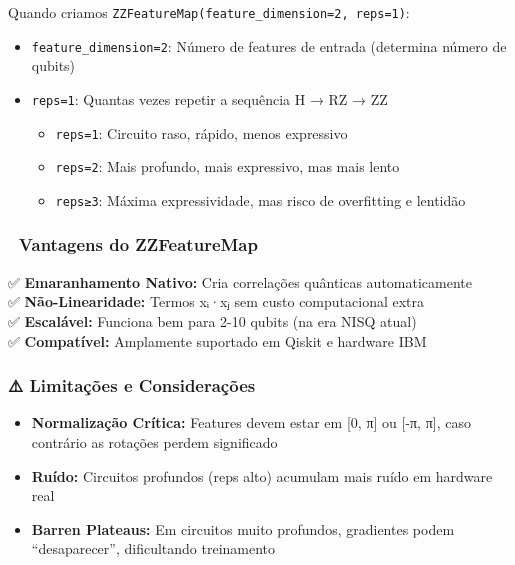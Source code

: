 \documentclass[
  brazilian,
]{report}
\providecommand{\tightlist}{%
  \setlength{\itemsep}{0pt}\setlength{\parskip}{0pt}}
\begin{document}
Quando criamos \texttt{ZZFeatureMap(feature\_dimension=2,\ reps=1)}:

\begin{itemize}
\tightlist
\item
  \texttt{feature\_dimension=2}: Número de features de entrada
  (determina número de qubits)
\item
  \texttt{reps=1}: Quantas vezes repetir a sequência H → RZ → ZZ

  \begin{itemize}
  \tightlist
  \item
    \texttt{reps=1}: Circuito raso, rápido, menos expressivo
  \item
    \texttt{reps=2}: Mais profundo, mais expressivo, mas mais lento
  \item
    \texttt{reps≥3}: Máxima expressividade, mas risco de overfitting e
    lentidão
  \end{itemize}
\end{itemize}

\subsubsection{🌟 Vantagens do
ZZFeatureMap}\label{vantagens-do-zzfeaturemap}

✅ \textbf{Emaranhamento Nativo:} Cria correlações quânticas
automaticamente\\
✅ \textbf{Não-Linearidade:} Termos xᵢ·xⱼ sem custo computacional
extra\\
✅ \textbf{Escalável:} Funciona bem para 2-10 qubits (na era NISQ
atual)\\
✅ \textbf{Compatível:} Amplamente suportado em Qiskit e hardware IBM

\subsubsection{⚠️ Limitações e
Considerações}\label{limitauxe7uxf5es-e-considerauxe7uxf5es}

\begin{itemize}
\tightlist
\item
  \textbf{Normalização Crítica:} Features devem estar em {[}0, π{]} ou
  {[}-π, π{]}, caso contrário as rotações perdem significado
\item
  \textbf{Ruído:} Circuitos profundos (reps alto) acumulam mais ruído em
  hardware real
\item
  \textbf{Barren Plateaus:} Em circuitos muito profundos, gradientes
  podem ``desaparecer'', dificultando treinamento
\end{itemize}
\end{document}
